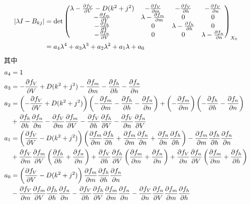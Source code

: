 \documentclass[
bachelor,
nofont, %
pdflinks,
]{xjtuthesis}
\begin{document}
\begin{align}
|\lambda I - B _{kj}|
& = \det 
\left(
\begin{matrix} 
\lambda - \pfr{f_V}{V} - D(k^2+j^2) & -\pfr{f_V}{m} & -\pfr{f_V}{h} & -\pfr{f_V}{n} \\ 
-\pfr{f_m}{V} & \lambda - \pfr{f_m}{m} & 0 & 0 \\ 
-\pfr{f_h}{V} & 0 & \lambda - \pfr{f_h}{h} & 0 \\
-\pfr{f_n}{V} & 0 & 0 & \lambda - \pfr{f_n}{n}
\end{matrix}
\right) _{X_0} \\
\notag &= a_4 \lambda^4 + a_3 \lambda^3 + a_2 \lambda^2 + a_1 \lambda +a_0
\end{align}
其中
\begin{align*}
a_4 &= 1 \\
a_3 &= -\pfr{f_V}{V} + D(k^2 + j^2) - \pfr{f_m}{m} - \pfr{f_h}{h} - \pfr{f_n}{n} \\
a_2 &= \left(-\pfr{f_V}{V}+D(k^2+j^2)\right) \left(-\pfr{f_m}{m} - \pfr{f_h}{h} - \pfr{f_n}{n}\right) + \left(-\pfr{f_m}{m}\right) 
\left(-\pfr{f_h}{h} - \pfr{f_n}{n}\right)\\
&+ \pfr{f_h}{h} \pfr{f_n}{n} - \pfr{f_V}{m} \pfr{f_m}{V} - \pfr{f_V}{h} \pfr{f_h}{V} - \pfr{f_V}{n} \pfr{f_n}{V} \\
a_1 &= \left(\pfr{f_V}{V} - D(k^2+j^2)\right)
\left(\pfr{f_m}{m} \pfr{f_h}{h} + \pfr{f_m}{m} \pfr{f_n}{n} + \pfr{f_n}{n} \pfr{f_h}{h}\right) - \pfr{f_m}{m} \pfr{f_h}{h} \pfr{f_n}{n}\\
&+ \pfr{f_V}{m} \pfr{f_m}{V} \left(\pfr{f_h}{h} + \pfr{f_n}{n}\right)
+ \pfr{f_V}{h} \pfr{f_h}{V} \left(\pfr{f_m}{m} + \pfr{f_n}{n}\right)
+ \pfr{f_V}{n} \pfr{f_n}{V} \left(\pfr{f_m}{m} + \pfr{f_h}{h}\right)\\
a_0 &= \left(\pfr{f_V}{V} - D(k^2 + j^2)\right) 
\pfr{f_m}{m} \pfr{f_h}{h} \pfr{f_n}{n} \\
&-\pfr{f_V}{m} \pfr{f_m}{V} \pfr{f_h}{h} \pfr{f_n}{n}
-\pfr{f_V}{h} \pfr{f_h}{V} \pfr{f_m}{m} \pfr{f_n}{n}
-\pfr{f_V}{n} \pfr{f_n}{V} \pfr{f_m}{m} \pfr{f_h}{h}
\end{align*}
\end{document}
